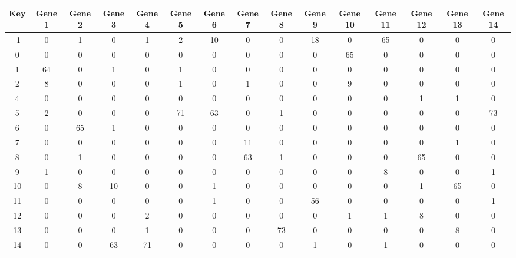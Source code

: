 \begin{tabular}{|c|c|c|c|c|c|c|c|c|c|c|c|c|c|c|}
\hline
Key & Gene 1 & Gene 2 & Gene 3 & Gene 4 & Gene 5 & Gene 6 & Gene 7 & Gene 8 & Gene 9 & Gene 10 & Gene 11 & Gene 12 & Gene 13 & Gene 14 \\
\hline
-1 & 0 & 1 & 0 & 1 & 2 & 10 & 0 & 0 & 18 & 0 & 65 & 0 & 0 & 0 \\
0 & 0 & 0 & 0 & 0 & 0 & 0 & 0 & 0 & 0 & 65 & 0 & 0 & 0 & 0 \\
1 & 64 & 0 & 1 & 0 & 1 & 0 & 0 & 0 & 0 & 0 & 0 & 0 & 0 & 0 \\
2 & 8 & 0 & 0 & 0 & 1 & 0 & 1 & 0 & 0 & 9 & 0 & 0 & 0 & 0 \\
4 & 0 & 0 & 0 & 0 & 0 & 0 & 0 & 0 & 0 & 0 & 0 & 1 & 1 & 0 \\
5 & 2 & 0 & 0 & 0 & 71 & 63 & 0 & 1 & 0 & 0 & 0 & 0 & 0 & 73 \\
6 & 0 & 65 & 1 & 0 & 0 & 0 & 0 & 0 & 0 & 0 & 0 & 0 & 0 & 0 \\
7 & 0 & 0 & 0 & 0 & 0 & 0 & 11 & 0 & 0 & 0 & 0 & 0 & 1 & 0 \\
8 & 0 & 1 & 0 & 0 & 0 & 0 & 63 & 1 & 0 & 0 & 0 & 65 & 0 & 0 \\
9 & 1 & 0 & 0 & 0 & 0 & 0 & 0 & 0 & 0 & 0 & 8 & 0 & 0 & 1 \\
10 & 0 & 8 & 10 & 0 & 0 & 1 & 0 & 0 & 0 & 0 & 0 & 1 & 65 & 0 \\
11 & 0 & 0 & 0 & 0 & 0 & 1 & 0 & 0 & 56 & 0 & 0 & 0 & 0 & 1 \\
12 & 0 & 0 & 0 & 2 & 0 & 0 & 0 & 0 & 0 & 1 & 1 & 8 & 0 & 0 \\
13 & 0 & 0 & 0 & 1 & 0 & 0 & 0 & 73 & 0 & 0 & 0 & 0 & 8 & 0 \\
14 & 0 & 0 & 63 & 71 & 0 & 0 & 0 & 0 & 1 & 0 & 1 & 0 & 0 & 0 \\
\hline
\end{tabular}